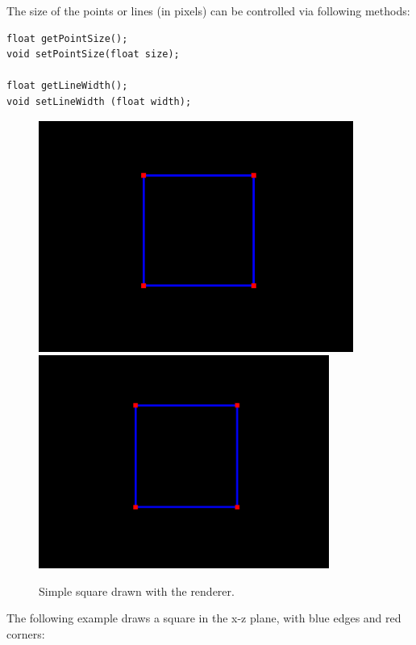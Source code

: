 The size of the points or lines (in pixels) can be controlled via
following methods:
%
\begin{lstlisting}[]
float getPointSize();
void setPointSize(float size);

float getLineWidth();
void setLineWidth (float width);
\end{lstlisting}
%
\begin{figure}[t]
\begin{center}
\iflatexml
 \includegraphics[]{images/drawSquare}
\else
 \includegraphics[width=3.75in]{images/drawSquare}
\fi
\end{center}
\caption{Simple square drawn with the renderer.}
\label{drawSquare:fig}
\end{figure}
%
The following example draws a square in the x-z plane, with blue edges
and red corners:
%
